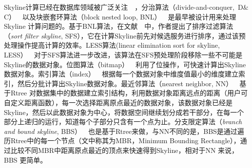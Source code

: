 Skyline计算已经在数据库领域被广泛关注~\cite{yu2013efficient}~，分治算法（divide-and-conquer,~D$\&$C）~\cite{borzsony2001skyline}~以及块嵌套环算法（block nested loop, BNL）~\cite{borzsony2001skyline}~是最早被设计用来处理Skyline 计算问题的。基于BNL算法，在文献~\cite{chomicki2003skyline}~中，作者提出了排序过滤算法（\emph{sort filter skyline}, SFS），它在计算Skyline前先对候选服务进行排序，通过该预处理操作提高计算的效率。LESS算法(linear elimination sort for skyline, LESS）~\cite{godfrey2005maximal}~对于SFS算法进一步改进，该算法在SFS预处理阶段移除一些不可能是Skyline的数据对象。位图算法（bitmap）~\cite{tan2001efficient}~利用了位操作，可快速计算出Skyline数据对象。索引算法（index）~\cite{tan2001efficient}~根据每一个数据对象中维度值最小的维度建立索引，然后分批计算出Skyline数据对象。最近邻算法（nearest neighbor, NN）~\cite{kossmann2002shooting}~基于Rtree 对数据集中的数据建立索引结构，利用数据对象距离远点的距离（用户可自定义距离函数），每一次选择距离原点最近的数据对象，该数据对象已经是Skyline，然后以此数据对象为中心，将数据空间继续划分成若干部分，在每一个部分上递归的运行，知道每个子部分只含有一个点为止。分支限定算法（\emph{branch and bound skyline}, BBS）~\cite{papadias2005progressive}~也是基于Rtree来做，与NN不同的是，BBS是通过遍历Rtree中的每一个节点（文中称其为MBR，Minimum Bounding Rectangle），通过比较不同MBR中距离原点最近的顶点来快速得到Skyline，相对于NN 来说，BBS 更简单。

